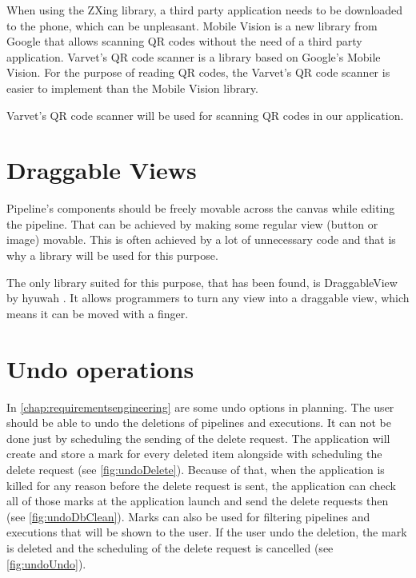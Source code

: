 When using the ZXing library, a third party application needs to be downloaded to the phone, which can be unpleasant.
Mobile Vision is a new library from Google that allows scanning QR codes without the need of a third party application.
Varvet's QR code scanner is a library based on Google's Mobile Vision.
For the purpose of reading QR codes, the Varvet's QR code scanner is easier to implement than the Mobile Vision library.

Varvet's QR code scanner will be used for scanning QR codes in our application.

\section{Draggable Views}
Pipeline's components should be freely movable across the canvas while editing the pipeline.
That can be achieved by making some regular view (button or image) movable.
This is often achieved by a lot of unnecessary code and that is why a library will be used for this purpose.

The only library suited for this purpose, that has been found, is DraggableView by hyuwah \cite{draggable}.
It allows programmers to turn any view into a draggable view, which means it can be moved with a finger.

\section{Undo operations}
In \autoref{chap:requirementsengineering} are some undo options in planning.
The user should be able to undo the deletions of pipelines and executions.
It can not be done just by scheduling the sending of the delete request.
The application will create and store a mark for every deleted item alongside with scheduling the delete request (see \autoref{fig:undoDelete}).
Because of that, when the application is killed for any reason before the delete request is sent, the application can check all of those marks at the application launch and send the delete requests then (see \autoref{fig:undoDbClean}).
Marks can also be used for filtering pipelines and executions that will be shown to the user.
If the user undo the deletion, the mark is deleted and the scheduling of the delete request is cancelled (see \autoref{fig:undoUndo}).

